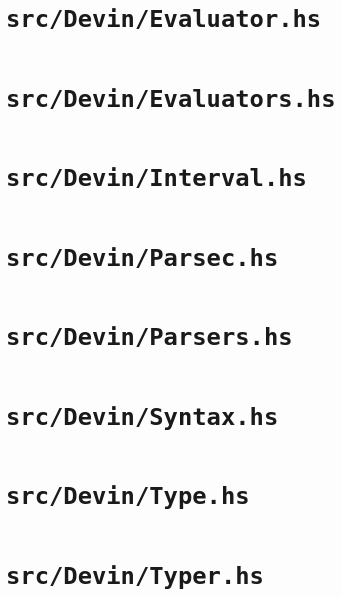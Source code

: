 \documentclass[UdineBachThesis,american,11pt]{PhdThesis}
\begin{document}
  \section{\texttt{src/Devin/Evaluator.hs}}

  

  \section{\texttt{src/Devin/Evaluators.hs}}

  

  \section{\texttt{src/Devin/Interval.hs}}

  

  \section{\texttt{src/Devin/Parsec.hs}}

  

  \section{\texttt{src/Devin/Parsers.hs}}

  

  \section{\texttt{src/Devin/Syntax.hs}}

  

  \section{\texttt{src/Devin/Type.hs}}

  

  \section{\texttt{src/Devin/Typer.hs}}
\end{document}
